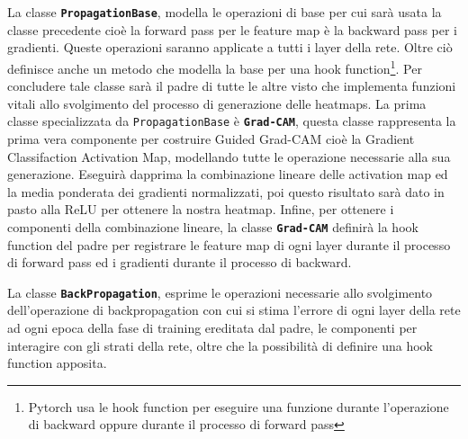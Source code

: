 La classe \textbf{\texttt{PropagationBase}}, modella le operazioni di base per cui sarà usata la classe precedente 
cioè la forward pass per le feature map è la backward pass per i gradienti. Queste operazioni saranno applicate a 
tutti i layer della rete. Oltre ciò definisce anche un metodo che modella la base per una hook function\footnote{Pytorch
usa le hook function per eseguire una funzione durante l'operazione di backward oppure durante il processo di 
forward pass}. Per concludere tale classe sarà il padre di tutte le altre visto che implementa funzioni vitali allo 
svolgimento del processo di generazione delle heatmaps. 
La prima classe specializzata da \texttt{PropagationBase} è \textbf{\texttt{Grad-CAM}},
questa classe rappresenta la prima vera componente per costruire Guided Grad-CAM cioè la Gradient Classifaction
Activation Map, modellando tutte le operazione necessarie alla sua generazione. Eseguirà dapprima la combinazione
lineare delle activation map ed la media ponderata dei gradienti normalizzati, poi questo risultato sarà dato in 
pasto alla ReLU per ottenere la nostra heatmap. 
Infine, per ottenere i componenti della combinazione lineare, la classe \textbf{\texttt{Grad-CAM}} definirà la 
hook function del padre per registrare le feature map di ogni layer durante il processo di forward pass ed i 
gradienti durante il processo di backward. 

La classe \textbf{\texttt{BackPropagation}}, esprime le operazioni necessarie allo svolgimento dell'operazione 
di backpropagation con cui si stima l'errore di ogni layer della rete ad ogni epoca della fase di training 
ereditata dal padre, le componenti per interagire con gli strati della rete, oltre che la possibilità di definire 
una hook function apposita. 


